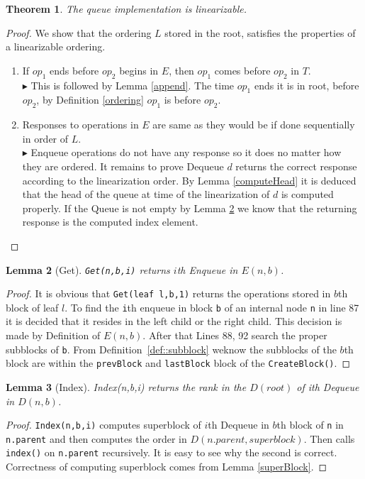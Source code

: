 \documentclass[10pt]{article}
\newtheorem{theorem}{Theorem}
\newtheorem{lemma}[theorem]{Lemma}
\theoremstyle{definition}
\begin{document}
\begin{theorem}
The queue implementation is linearizable.
\end{theorem}
\begin{proof}
  We show that the ordering $L$ stored in the root, satisfies the properties of a linearizable ordering.
  \begin{enumerate}
    \item If $op_1$ ends before $op_2$ begins in $E$, then $op_1$ comes before $op_2$ in $T$.\\$\blacktriangleright$ This is followed by Lemma \ref{append}. The time $op_1$ ends it is in root, before $op_2$, by Definition \ref{ordering} $op_1$ is before $op_2$.
    \item Responses to operations in $E$ are same as they would be if done sequentially in order of $L$. \\$\blacktriangleright$ Enqueue operations do not have any response so it does no matter how they are ordered. It remains to prove  Dequeue $d$ returns the correct response according to the linearization order. By Lemma \ref{computeHead} it is deduced that the head of the queue at time of the linearization of $d$ is computed properly. If the Queue is not empty by Lemma \ref{get} we know that the returning response is the computed index element.
  \end{enumerate} 
\end{proof}

\begin{lemma}[Get] \label{get}
\texttt{Get(n,b,i)} returns $i$th Enqueue in $E(n,b)$.
\end{lemma}
\begin{proof}
It is obvious that \texttt{Get(leaf l,b,1)} returns the operations stored in $b$th block of leaf $l$. To find the \texttt{i}th enqueue in block \texttt{b} of an internal node \texttt{n} in line 87 it is decided that it resides in the left child or the right child. This decision is made by Definition of $E(n,b)$. After that Lines 88, 92 search the proper subblocks of \texttt{b}. From Definition~\ref{def::subblock} weknow the subblocks of the $b$th block are within the \texttt{prevBlock} and \texttt{lastBlock} block of the \texttt{CreateBlock()}.
\end{proof}

\begin{lemma}[Index]
 Index(n,b,i) returns the rank in the $D(root)$ of ith Dequeue in $D(n,b)$.
\end{lemma}
\begin{proof}
  \texttt{Index(n,b,i)} computes superblock of $i$th Dequeue in $b$th block of \texttt{n} in \texttt{n.parent} and then computes the order in $D(n.parent, superblock)$. Then calls \texttt{index()} on \texttt{n.parent} recursively. It is easy to see why the second is correct. Correctness of computing superblock comes from Lemma \ref{superBlock}.
\end{proof}
\end{document}
